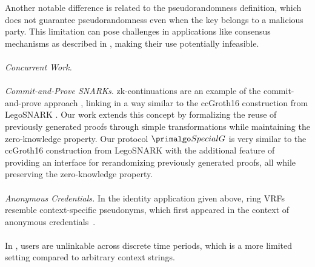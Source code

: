 Another notable difference is related to the pseudorandomness definition, which does not guarantee pseudorandomness even when the key belongs to a malicious party. This limitation can pose challenges in applications like consensus mechanisms as described in \cite{anonymousVRF}, making their use potentially infeasible.
\\\\
\noindent\textit{Concurrent Work.} 
\\\\
\noindent\textit{Commit-and-Prove SNARKs.} zk-continuations are an example of the commit-and-prove approach \cite{LegoSNARK}, linking  in a way similar to the ccGroth16 construction from LegoSNARK \cite{LegoSNARK}. Our work extends this concept by formalizing the reuse of previously generated proofs through simple transformations while maintaining the zero-knowledge property. Our protocol $ \SpecialG $ is very similar to the ccGroth16 construction from LegoSNARK \cite{LegoSNARK} with the additional feature of providing an interface for rerandomizing previously generated proofs, all while preserving the zero-knowledge property. 
\\\\
 \emph{Anonymous Credentials.} In the identity application given above, ring VRFs resemble context-specific pseudonyms, which first appeared in the context of anonymous credentials~\cite{DBLP:journals/cacm/Chaum85,DBLP:conf/crypto/ChaumE86,EC:CamLys01}. 
\\\\
In \cite{DBLP:conf/eurocrypt/DamgardDP06,DBLP:conf/ccs/CamenischHKLM06}, users are unlinkable across discrete time periods, which is a more limited setting compared to arbitrary context strings.